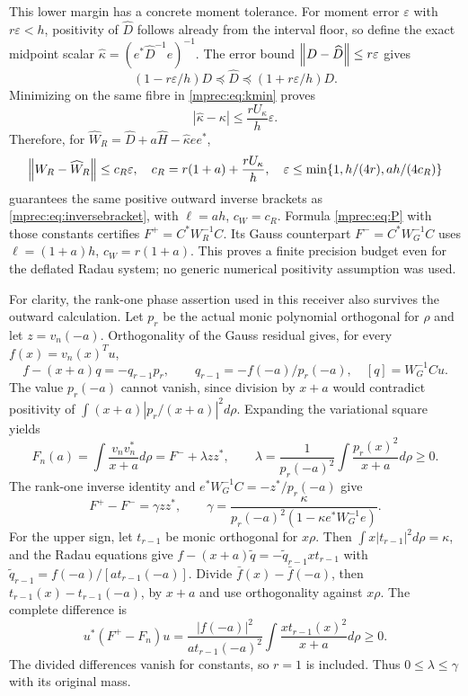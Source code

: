 \documentclass[11pt]{article}
\begin{document}
This lower margin has a concrete moment tolerance. For moment
error $\varepsilon$ with $r\varepsilon<h$, positivity of
$\widehat D$ follows already from the interval floor, so define
the exact midpoint scalar $\widehat\kappa=(e^*\widehat D^{-1}e)^{-1}$.
The error bound $\left\lVert D-\widehat D\right\rVert\le r\varepsilon$ gives
\[
 (1-r\varepsilon/h)D\preceq\widehat D
 \preceq(1+r\varepsilon/h)D.
\]
Minimizing on the same fibre in \eqref{mprec:eq:kmin} proves
\begin{equation}\label{mprec:eq:kerror}
 |\widehat\kappa-\kappa|\le
                  \frac{rU_\kappa}{h}\varepsilon.
\end{equation}
Therefore, for
$\widehat W_R=\widehat D+a\widehat H-\widehat\kappa ee^*$,
\begin{equation}\label{mprec:eq:radauprecision}
 \left\lVert W_R-\widehat W_R\right\rVert\le c_R\varepsilon,
 \quad c_R=r(1+a)+\frac{rU_\kappa}{h},\quad
 \varepsilon\le\min\{1,h/(4r),ah/(4c_R)\}
\end{equation}
guarantees the same positive outward inverse brackets as
\eqref{mprec:eq:inversebracket}, with $\ell=ah$, $c_W=c_R$.
Formula \eqref{mprec:eq:P} with those constants certifies
$F^+=C^*W_R^{-1}C$. Its Gauss counterpart
$F^-=C^*W_G^{-1}C$ uses $\ell=(1+a)h$, $c_W=r(1+a)$.
This proves a finite precision budget even for the deflated Radau
system; no generic numerical positivity assumption was used.

For clarity, the rank-one phase assertion used in this receiver
also survives the outward calculation. Let $p_r$ be the actual
monic polynomial orthogonal for $\rho$ and let $z=v_n(-a)$.
Orthogonality of the Gauss residual gives, for every
$f(x)=v_n(x)^Tu$,
\[
 f-(x+a)q=-q_{r-1}p_r,\qquad q_{r-1}=-f(-a)/p_r(-a),
 \quad[q]=W_G^{-1}Cu.
\]
The value $p_r(-a)$ cannot vanish, since division by $x+a$
would contradict positivity of $\int(x+a)|p_r/(x+a)|^2d\rho$.
Expanding the variational square yields
\begin{equation}\label{mprec:eq:phase}
 F_n(a)=\int\frac{v_nv_n^*}{x+a}d\rho
       =F^-+\lambda zz^*,\qquad
 \lambda=\frac1{p_r(-a)^2}\int\frac{p_r(x)^2}{x+a}d\rho\ge0.
\end{equation}
The rank-one inverse identity and
$e^*W_G^{-1}C=-z^*/p_r(-a)$ give
\[
 F^+-F^-=\gamma zz^*,\qquad
 \gamma=\frac{\kappa}{p_r(-a)^2(1-\kappa e^*W_G^{-1}e)}.
\]
For the upper sign, let $t_{r-1}$ be monic orthogonal for $x\rho$.
Then $\int x|t_{r-1}|^2d\rho=\kappa$, and the Radau equations
give $f-(x+a)\widetilde q=-\widetilde q_{r-1}xt_{r-1}$ with
$\widetilde q_{r-1}=f(-a)/[a t_{r-1}(-a)]$.
Divide $\bar f(x)-\bar f(-a)$, then
$t_{r-1}(x)-t_{r-1}(-a)$, by $x+a$ and use orthogonality
against $x\rho$. The complete difference is
\[
 u^*(F^+-F_n)u=
 \frac{|f(-a)|^2}{a t_{r-1}(-a)^2}
                   \int\frac{x t_{r-1}(x)^2}{x+a}d\rho\ge0.
\]
The divided differences vanish for constants, so $r=1$ is included.
Thus $0\le\lambda\le\gamma$ with its original mass.
\end{document}
